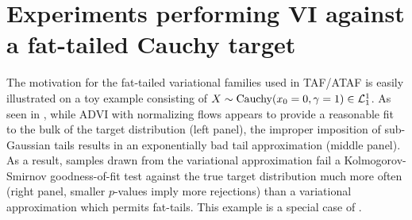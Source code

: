 \documentclass[twoside]{article}
\theoremstyle{definition}
\theoremstyle{remark}
\begin{document}
{%

  

\section{Experiments performing VI against a fat-tailed Cauchy target}
\label{sec:cauchy_normal_student}
The motivation for the fat-tailed variational families used in TAF/ATAF
is easily illustrated on a toy example consisting of $X \sim \text{Cauchy}(x_0 = 0, \gamma = 1) \in \mathcal{L}^1_1$.
As seen in , while ADVI with normalizing flows \citep{kingma2016improved,webb2019improving}
appears to provide a reasonable fit to the bulk of the target distribution (left panel), the improper
imposition of sub-Gaussian tails results in an exponentially bad tail approximation (middle panel).
As a result, samples drawn from the variational approximation fail a Kolmogorov-Smirnov goodness-of-fit
test against the true target distribution much more often (right panel, smaller $p$-values imply more rejections)
than a variational approximation which permits fat-tails. This example is a special case of .

}
\end{document}
